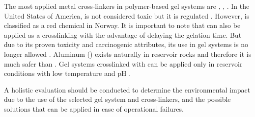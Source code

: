 The most applied metal cross-linkers in polymer-based gel systems are , , . In the United States of America,   is not considered toxic but it is regulated \citep{AgencyforToxicSubstancesandDiseaseRegistry2012}. However,  is classified as a red chemical in Norway. It is important to note that  can also be applied as a crosslinking with the advantage of delaying the gelation time. But due to its proven toxicity and carcinogenic attributes, its use in gel systems is no longer allowed \citep{Al-Muntasheri2012}. Aluminum () exists naturally in reservoir rocks and therefore it is much safer than . Gel systems crosslinked with  can be applied only in reservoir conditions with low temperature and pH \citep{Xin2013, Osman2013}.

A holistic evaluation should be conducted to determine the environmental impact due to the use of the selected gel system and cross-linkers, and the possible solutions that can be applied in case of operational failures.
































